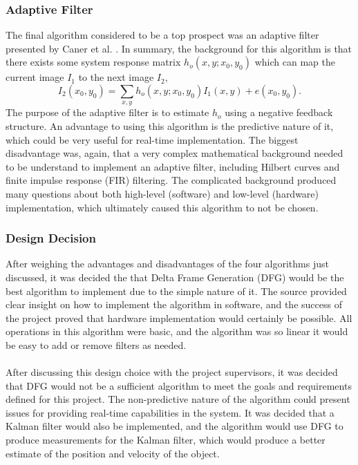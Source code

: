 \documentclass[12pt]{article} %
\begin{document}
\subsubsection{Adaptive Filter}
The final algorithm considered to be a top prospect was an adaptive filter presented by Caner et al. \cite{6}. In summary, the background for this algorithm is that there exists some system response matrix $h_o(x, y; x_0, y_0)$ which can map the current image $I_1$ to the next image $I_2$,
\[
I_2(x_0, y_0) = \sum_{x,y} h_o(x, y; x_0, y_0) I_1(x,y) + e(x_0, y_0).
\]
The purpose of the adaptive filter is to estimate $h_o$ using a negative feedback structure. An advantage to using this algorithm is the predictive nature of it, which could be very useful for real-time implementation. The biggest disadvantage was, again, that a very complex mathematical background needed to be understand to implement an adaptive filter, including Hilbert curves and finite impulse response (FIR) filtering. The complicated background produced many questions about both high-level (software) and low-level (hardware) implementation, which ultimately caused this algorithm to not be chosen.
\subsubsection{Design Decision}
After weighing the advantages and disadvantages of the four algorithms just discussed, it was decided the that Delta Frame Generation (DFG) would be the best algorithm to implement due to the simple nature of it. The source provided clear insight on how to implement the algorithm in software, and the success of the project proved that hardware implementation would certainly be possible. All operations in this algorithm were basic, and the algorithm was so linear it would be easy to add or remove filters as needed. \\\\
After discussing this design choice with the project supervisors, it was decided that DFG would not be a sufficient algorithm to meet the goals and requirements defined for this project. The non-predictive nature of the algorithm could present issues for providing real-time capabilities in the system. It was decided that a Kalman filter would also be implemented, and the algorithm would use DFG to produce measurements for the Kalman filter, which would produce a better estimate of the position and velocity of the object.
\end{document}
